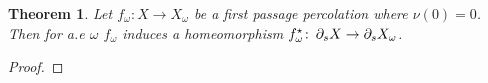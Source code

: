 \documentclass[12 pt]{amsart}
\newcommand{\calN}{\mathcal{N}}
\newcommand{\calU}{\mathcal{U}}
\newcommand{\calV}{\mathcal{V}}
\newcommand{\bfa}{\textbf{a}}
\newcommand{\bfb}{\textbf{b}}
\newtheorem{theorem}{Theorem}[section]
\theoremstyle{definition}
\theoremstyle{remark}
\newcommand{\thmref}[1]{Theorem~\ref{#1}}
\newcommand{\corref}[1]{Corollary~\ref{#1}}
\newcommand{\pka}{\partial_{\kappa}}
\newcommand{\sK}{{\sf K}}
\newcommand{\sQ}{{\sf Q}}
\newcommand{\sR}{{\sf R}}
\renewcommand{\bfa}{{\sf a}}
\newcommand{\kk}{{\sf k}}
\newcommand{\mm}{{\sf m}}
\newcommand{\nn}{{\sf n}}
\newcommand{\qq}{{\sf q}}
\newcommand{\rr}{{\sf r}}
\newcommand{\from}{\colon\thinspace}
\begin{document}
\begin{theorem}\label{invarianttopology}
Let $f_\omega: X \rightarrow X_\omega$ be a first passage percolation where $\nu({0})=0$.  Then for a.e $\omega $ $f_\omega$ induces a homeomorphism 
$f^\star_\omega \from \partial_s X \to \partial_s X_\omega$.
\end{theorem}

\begin{proof}

\end{proof}
\end{document}
